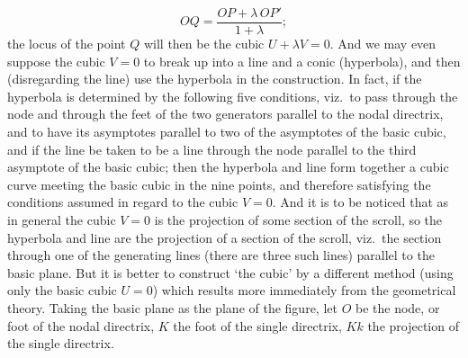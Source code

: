 \documentclass[11pt,a4paper]{article}
\theoremstyle{plain}
\begin{document}
\[
OQ = \frac{OP + \lambda\,OP'}{1 + \lambda};
\]
the locus of the point $Q$ will then be the cubic $U + \lambda V = 0$. And we may even suppose the cubic $V = 0$ to break up into a line and a conic (hyperbola), and then (disregarding the line) use the hyperbola in the construction. In fact, if the hyperbola is determined by the following five conditions, viz.\ to pass through the node and through the feet of the two generators parallel to the nodal directrix, and to have its asymptotes parallel to two of the asymptotes of the basic cubic, and if the line be taken to be a line through the node parallel to the third asymptote of the basic cubic; then the hyperbola and line form together a cubic curve meeting the basic cubic in the nine points, and therefore satisfying the conditions assumed in regard to the cubic $V = 0$. And it is to be noticed that as in general the cubic $V = 0$ is the projection of some section of the scroll, so the hyperbola and line are the projection of a section of the scroll, viz.\ the section through one of the generating lines (there are three such lines) parallel to the basic plane. But it is better to construct `the cubic' by a different method (using only the basic cubic $U = 0$) which results more immediately from the geometrical theory. Taking the basic plane as the plane of the figure, let $O$ be the node, or foot of the nodal directrix, $K$ the foot of the single directrix, $Kk$ the projection of the single directrix.

\begin{center}
\end{center}
\end{document}
